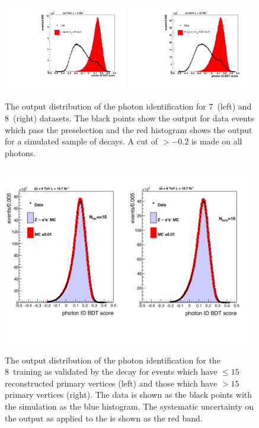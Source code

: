 \begin{figure}
  \includegraphics[width=0.48\textwidth]{selec_and_cats/plots/lowScoreID_7TeV.pdf}
  \includegraphics[width=0.48\textwidth]{selec_and_cats/plots/lowScoreID_8TeV.pdf}
  \caption[The output distribution of the photon identification \acs{BDT}]{The output distribution of the photon identification \BDT for 7~\TeV (left) and 8~\TeV (right) datasets. The black points show the output for data events which pass the preselection and the red histogram shows the output for a simulated \MC sample of \Hgg decays. A cut of $>-0.2$ is made on all photons.}
  \label{fig:photon_id_bdt}
\end{figure}

\begin{figure}
  \includegraphics[width=0.98\textwidth]{selec_and_cats/plots/idmva_nvtx.pdf}
  \caption[The output distribution of the photon identification \acs{BDT} in \Zee decays]{The output distribution of the photon identification \BDT for the 8~\TeV training as validated by the \Zee decay for events which have $\leq15$ reconstructed primary vertices (left) and those which have $>15$ primary vertices (right). The data is shown as the black points with the \MC simulation as the blue histogram. The systematic uncertainty on the output as applied to the \MC is shown as the red band.}
  \label{fig:photon_id_zee}
\end{figure}

